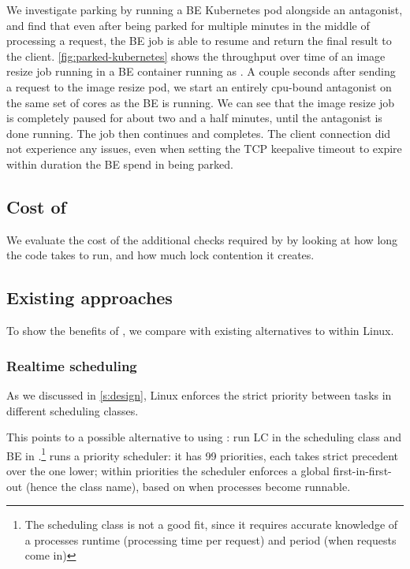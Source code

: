 We investigate parking by running a BE Kubernetes pod alongside an antagonist,
and find that even after being parked for multiple minutes in the middle of
processing a request, the BE job is able to resume and return the final result
to the client. \autoref{fig:parked-kubernetes} shows the throughput over time of
an image resize job running in a BE container running as \schedbe{}. A couple
seconds after sending a request to the image resize pod, we start an entirely
cpu-bound antagonist on the same set of cores as the BE is running. We can see
that the image resize job is completely paused for about two and a half minutes,
until the antagonist is done running. The job then continues and completes. The
client connection did not experience any issues, even when setting the TCP
keepalive timeout to expire within duration the BE spend in being parked.



\subsection{Cost of \schedbe{}}

We evaluate the cost of the additional checks required by \schedbe{} by looking
at how long the code takes to run, and how much lock contention it
creates.




\subsection{Existing approaches}\label{ss:eval:existing}

To show the benefits of \schedbe{}, we compare with existing alternatives to
\cgroups{} within Linux.

\subsubsection{Realtime scheduling}

As we discussed in \autoref{s:design}, Linux enforces the strict priority
between tasks in different scheduling classes. 

This points to a possible alternative to using \cgroups{}: run LC in the
\fifoclass{} scheduling class and BE in \normalclass{}.\footnote{The
\deadlineclass{} scheduling class is not a good fit, since it requires accurate
knowledge of a processes runtime (processing time per request) and period (when
requests come in)} \fifoclass{} runs a priority scheduler: it has 99 priorities,
each takes strict precedent over the one lower; within priorities the scheduler
enforces a global first-in-first-out (hence the \fifoclass{} class name), based
on when processes become runnable.

